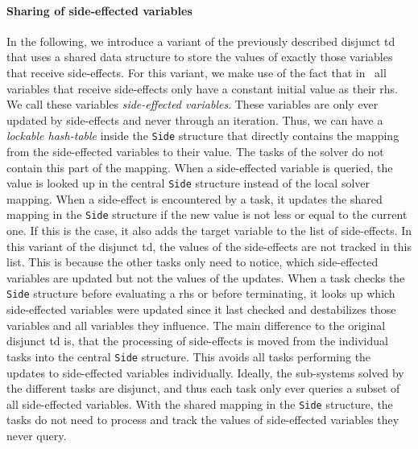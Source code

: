     \paragraph{Sharing of side-effected variables} In the following, we introduce a variant of the previously described disjunct \ac{td} that uses a shared data structure to store the values of exactly those variables that receive side-effects. For this variant, we make use of the fact that in \gob\ all variables that receive side-effects only have a constant initial value as their \ac{rhs}. We call these variables \textit{side-effected variables}. These variables are only ever updated by side-effects and never through an iteration. Thus, we can have a \textit{lockable hash-table} inside the \texttt{Side} structure that directly contains the mapping from the side-effected variables to their value. The tasks of the solver do not contain this part of the mapping. When a side-effected variable is queried, the value is looked up in the central \texttt{Side} structure instead of the local solver mapping. When a side-effect is encountered by a task, it updates the shared mapping in the \texttt{Side} structure if the new value is not less or equal to the current one. If this is the case, it also adds the target variable to the list of side-effects. In this variant of the disjunct \ac{td}, the values of the side-effects are not tracked in this list. This is because the other tasks only need to notice, which side-effected variables are updated but not the values of the updates. When a task checks the \texttt{Side} structure before evaluating a \ac{rhs} or before terminating, it looks up which side-effected variables were updated since it last checked and destabilizes those variables and all variables they influence. The main difference to the original disjunct \ac{td} is, that the processing of side-effects is moved from the individual tasks into the central \texttt{Side} structure. This avoids all tasks performing the updates to side-effected variables individually. Ideally, the sub-systems solved by the different tasks are disjunct, and thus each task only ever queries a subset of all side-effected variables. With the shared mapping in the \texttt{Side} structure, the tasks do not need to process and track the values of side-effected variables they never query.
    